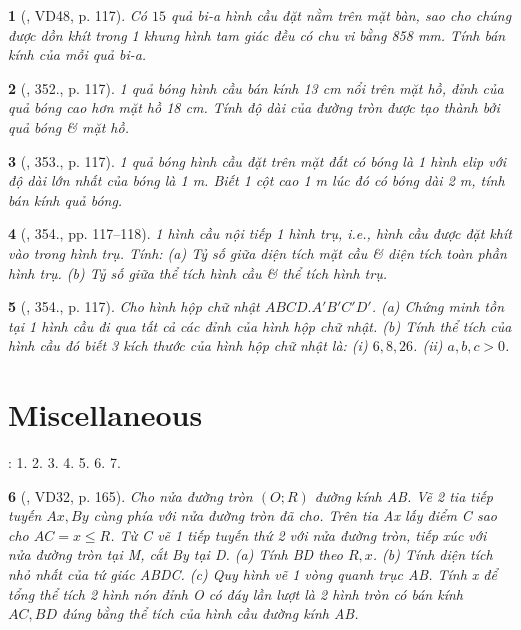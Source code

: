 \documentclass{article}
\newtheorem{baitoan}{}
\begin{document}
\begin{baitoan}[\cite{Binh_Toan_9_tap_2}, VD48, p. 117]
	Có $15$ quả bi-a hình cầu đặt nằm trên mặt bàn, sao cho chúng được dồn khít trong 1 khung hình tam giác đều có chu vi bằng {\rm858 mm}. Tính bán kính của mỗi quả bi-a.
\end{baitoan}

\begin{baitoan}[\cite{Binh_Toan_9_tap_2}, 352., p. 117]
	1 quả bóng hình cầu bán kính {\rm13 cm} nổi trên mặt hồ, đỉnh của quả bóng cao hơn mặt hồ {\rm18 cm}. Tính độ dài của đường tròn được tạo thành bởi quả bóng \& mặt hồ.
\end{baitoan}

\begin{baitoan}[\cite{Binh_Toan_9_tap_2}, 353., p. 117]
	1 quả bóng hình cầu đặt trên mặt đất có bóng là 1 hình elip với độ dài lớn nhất của bóng là {\rm1 m}. Biết 1 cột cao {\rm1 m} lúc đó có bóng dài {\rm2 m}, tính bán kính quả bóng.
\end{baitoan}

\begin{baitoan}[\cite{Binh_Toan_9_tap_2}, 354., pp. 117--118]
	1 hình cầu nội tiếp 1 hình trụ, i.e., hình cầu được đặt khít vào trong hình trụ. Tính: (a) Tỷ số giữa diện tích mặt cầu \& diện tích toàn phần hình trụ. (b) Tỷ số giữa thể tích hình cầu \& thể tích hình trụ.
\end{baitoan}

\begin{baitoan}[\cite{Binh_Toan_9_tap_2}, 354., p. 117]
	Cho hình hộp chữ nhật $ABCD.A'B'C'D'$. (a) Chứng minh tồn tại 1 hình cầu đi qua tất cả các đỉnh của hình hộp chữ nhật. (b) Tính thể tích của hình cầu đó biết 3 kích thước của hình hộp chữ nhật là: (i) $6,8,26$. (ii) $a,b,c > 0$.
\end{baitoan}


\section{Miscellaneous}
\cite[BTCCX, pp. 109--110]{SGK_Toan_9_Canh_Dieu_tap_1}: 1. 2. 3. 4. 5. 6. 7.

\begin{baitoan}[\cite{Tuyen_Toan_9_old}, VD32, p. 165]
	Cho nửa đường tròn $(O;R)$ đường kính AB. Vẽ 2 tia tiếp tuyến $Ax,By$ cùng phía với nửa đường tròn đã cho. Trên tia Ax lấy điểm C sao cho $AC = x\le R$. Từ C vẽ 1 tiếp tuyến thứ 2 với nửa đường tròn, tiếp xúc với nửa đường tròn tại M, cắt By tại D. (a) Tính BD theo $R,x$. (b) Tính diện tích nhỏ nhất của tứ giác ABDC. (c) Quy hình vẽ 1 vòng quanh trục AB. Tính x để tổng thể tích 2 hình nón đỉnh O có đáy lần lượt là 2 hình tròn có bán kính $AC,BD$ đúng bằng thể tích của hình cầu đường kính AB.
\end{baitoan}
\end{document}

